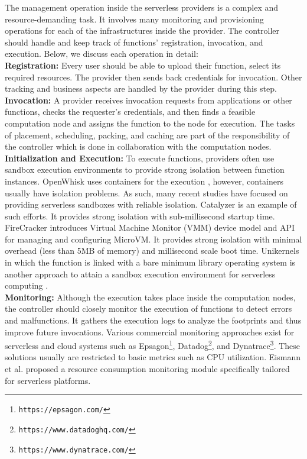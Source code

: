 The management operation inside the serverless providers is a complex and resource-demanding task. It involves many monitoring and provisioning operations for each of the infrastructures inside the provider. The controller should handle and keep track of functions' registration, invocation, and execution. Below, we discuss each operation in detail:
\\
\noindent \textbf{Registration:} Every user should be able to upload their function, select its required resources. The provider then sends back credentials for invocation. Other tracking and business aspects are handled by the provider during this step.
\\
\noindent \textbf{Invocation:} A provider receives invocation requests from applications or other functions, checks the requester's credentials, and then finds a feasible computation node and assigns the function to the node for execution. The tasks of placement, scheduling, packing, and caching are part of the responsibility of the controller which is done in collaboration with the computation nodes.
\\
\noindent \textbf{Initialization and Execution:}
To execute functions, providers often use sandbox execution environments to provide strong isolation between function instances. OpenWhisk uses containers for the execution , however, containers usually have isolation problems. As such, many recent studies have focused on providing serverless sandboxes with reliable isolation. Catalyzer  is an example of such efforts. It provides strong isolation with sub-millisecond startup time. FireCracker  introduces Virtual Machine Monitor (VMM) device model and API for managing and configuring MicroVM. It provides strong isolation with minimal overhead (less than 5MB of memory) and millisecond scale boot time. Unikernels in which the function is linked with a bare minimum library operating system is another approach to attain a sandbox execution environment for serverless computing .
\\
\noindent \textbf{Monitoring:} Although the execution takes place inside the computation nodes, the controller should closely monitor the execution of functions to detect errors and malfunctions. It gathers the execution logs to analyze the footprints and thus improve future invocations. Various commercial monitoring approaches exist for serverless and cloud systems such as Epsagon\footnote{\texttt{https://epsagon.com/}}, Datadog\footnote{\texttt{https://www.datadoghq.com/}}, and Dynatrace\footnote{\texttt{https://www.dynatrace.com/}}. These solutions usually are restricted to basic metrics such as CPU utilization. Eismann et al.  proposed a  resource consumption monitoring module specifically tailored for serverless platforms.
